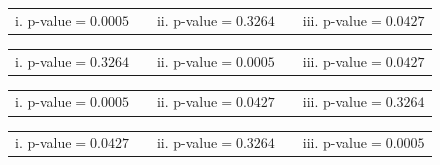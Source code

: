 \documentclass{article}
\begin{document}
\begin{mcquestions}
		\begin{mcanswerslist}
			\answer \begin{tabular}{lp{0.75in}cp{0.75in}r}
				i. p-value$=0.0005$ && ii. p-value$=0.3264$ && iii. p-value$=0.0427$
			\end{tabular}
			\answer[correct] \begin{tabular}{lp{0.75in}cp{0.75in}r}
				i. p-value$=0.3264$ && ii. p-value$=0.0005$ && iii. p-value$=0.0427$
			\end{tabular}
			\answer \begin{tabular}{lp{0.75in}cp{0.75in}r}
				i. p-value$=0.0005$ && ii. p-value$=0.0427$ && iii. p-value$=0.3264$
			\end{tabular}
			\answer \begin{tabular}{lp{0.75in}cp{0.75in}r}
				i. p-value$=0.0427$ && ii. p-value$=0.3264$ && iii. p-value$=0.0005$
			\end{tabular}
		\end{mcanswerslist}
	\end{mcquestions}
\end{document}
